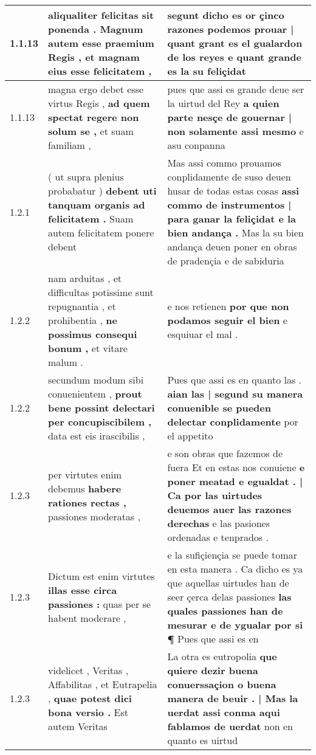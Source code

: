 \begin{tabular}{|p{1cm}|p{6.5cm}|p{6.5cm}|}
1.1.13 & aliqualiter felicitas sit ponenda . \textbf{ Magnum autem esse praemium Regis , } et magnam eius esse felicitatem , & segunt dicho es \textbf{ or çinco razones podemos prouar | quant grant es el gualardon de los reyes } e quant grande es la su feliçidat \\\hline
1.1.13 & magna ergo debet esse virtus Regis , \textbf{ ad quem spectat regere non solum se , } et suam familiam , & pues que assi es grande deue ser la uirtud del Rey \textbf{ a quien parte nesçe de gouernar | non solamente assi mesmo } e asu conpanna \\\hline
1.2.1 & ( ut supra plenius probabatur ) \textbf{ debent uti tanquam organis ad felicitatem . } Suam autem felicitatem ponere debent & Mas assi commo prouamos conplidamente de suso deuen husar de todas estas cosas \textbf{ assi commo de instrumentos | para ganar la feliçidat e la bien andança . } Mas la su bien andança deuen poner en obras de pradençia e de sabiduria \\\hline
1.2.2 & nam arduitas , et difficultas potissime sunt repugnantia , et prohibentia , \textbf{ ne possimus consequi bonum , } et vitare malum . & e nos retienen \textbf{ por que non podamos seguir el bien } e esquiuar el mal . \\\hline
1.2.2 & secundum modum sibi conuenientem , \textbf{ prout bene possint delectari per concupiscibilem , } data est eis irascibilis , & Pues que assi es en quanto las . \textbf{ aian las | segund su manera conuenible se pueden delectar conplidamente } por el appetito \\\hline
1.2.3 & per virtutes enim debemus \textbf{ habere rationes rectas , } passiones moderatas , & e son obras que fazemos de fuera Et en estas nos conuiene \textbf{ e poner meatad e egualdat . | Ca por las uirtudes deuemos auer las razones derechas } e las pasiones ordenadas e tenprados . \\\hline
1.2.3 & Dictum est enim virtutes \textbf{ illas esse circa passiones : } quas per se habent moderare , & e la sufiçiençia se puede tomar en esta manera . Ca dicho es ya que aquellas uirtudes han de seer çerca delas passiones \textbf{ las quales passiones han de mesurar e de ygualar por si ¶ } Pues que assi es en \\\hline
1.2.3 & videlicet , Veritas , Affabilitas , et Eutrapelia , \textbf{ quae potest dici bona versio . } Est autem Veritas & La otra es eutropolia \textbf{ que quiere dezir buena conuerssaçion o buena manera de beuir . | Mas la uerdat assi conma aqui fablamos de uerdat } non en quanto es uirtud \\\hline

\end{tabular}
